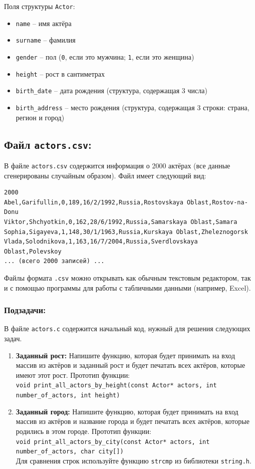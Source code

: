 \documentclass{article}
\begin{document}
Поля структуры \texttt{Actor}:
\begin{itemize}
\item \texttt{name} -- имя актёра
\item \texttt{surname} -- фамилия
\item \texttt{gender} -- пол (\texttt{0}, если это мужчина; \texttt{1}, если это женщина)
\item \texttt{height} -- рост в сантиметрах
\item \texttt{birth\_date} -- дата рождения (структура, содержащая 3 числа)
\item \texttt{birth\_address} -- место рождения (структура, содержащая 3 строки: страна, регион и город)
\end{itemize}


\subsection*{Файл \texttt{actors.csv}:}
В файле \texttt{actors.csv} содержится информация о 2000 актёрах (все данные сгенерированы случайным образом). Файл имеет следующий вид:
\begin{verbatim}
2000
Abel,Garifullin,0,189,16/2/1992,Russia,Rostovskaya Oblast,Rostov-na-Donu
Viktor,Shchyotkin,0,162,28/6/1992,Russia,Samarskaya Oblast,Samara
Sophia,Sigayeva,1,148,30/1/1963,Russia,Kurskaya Oblast,Zheleznogorsk
Vlada,Solodnikova,1,163,16/7/2004,Russia,Sverdlovskaya Oblast,Polevskoy
... (всего 2000 записей) ...
\end{verbatim}
Файлы формата \texttt{.csv} можно открывать как обычным текстовым редактором, так и с помощью программы для работы с табличными данными (например, Excel). 

\subsubsection*{Подзадачи:}
В файле \texttt{actors.c} содержится начальный код, нужный для решения следующих задач.
\begin{enumerate}
\item \textbf{Заданный рост:} Напишите функцию, которая будет принимать на вход массив из актёров и заданный рост и будет печатать всех актёров, которые имеют этот рост. Прототип функции:\\
\texttt{void print\_all\_actors\_by\_height(const Actor* actors, int number\_of\_actors, int height)}
\item \textbf{Заданный город:} Напишите функцию, которая будет принимать на вход массив из актёров и название города и будет печатать всех актёров, которые родились в этом городе. Прототип функции:\\
\texttt{void print\_all\_actors\_by\_city(const Actor* actors, int number\_of\_actors, char city[])}\\
Для сравнения строк используйте функцию \texttt{strcmp} из библиотеки \texttt{string.h}.
\end{enumerate}
\end{document}
